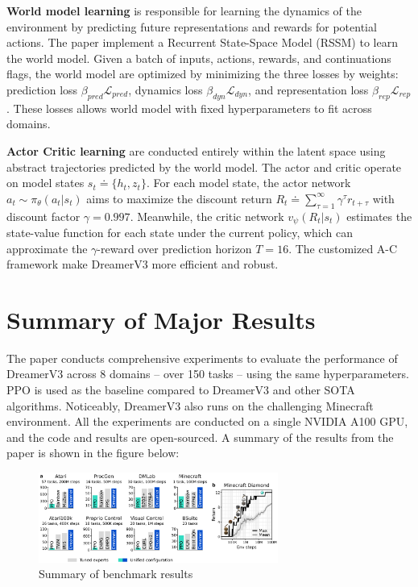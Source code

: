 \documentclass{article}
\begin{document}
\textbf{World model learning} is responsible for learning the dynamics of the environment by predicting future representations and rewards for potential actions. The paper implement a Recurrent State-Space Model (RSSM) to learn the world model. Given a batch of inputs, actions, rewards, and continuations flags, the world model are optimized by minimizing the three losses by weights: prediction loss $\beta_{pred}\mathcal{L}_{pred}$, dynamics loss $\beta_{dyn}\mathcal{L}_{dyn}$, and representation loss $\beta_{rep}\mathcal{L}_{rep}$. These losses allows world model with fixed hyperparameters to fit across domains.

\textbf{Actor Critic learning} are conducted entirely within the latent space using abstract trajectories predicted by the world model. The actor and critic operate on model states $s_t \doteq \{h_t, z_t\}$. For each model state, the actor network $a_t \sim \pi_\theta(a_t | s_t)$ aims to maximize the discount return $R_t \doteq \sum_{\tau = 1}^{\infty} \gamma^{\tau} r_{t+\tau}$ with discount factor $\gamma = 0.997$. Meanwhile, the critic network $v_\psi(R_t | s_t)$ estimates the state-value function for each state under the current policy, which can approximate the $\gamma$-reward over prediction horizon $T=16$. The customized A-C framework make DreamerV3 more efficient and robust.

\section{Summary of Major Results}

The paper conducts comprehensive experiments to evaluate the performance of DreamerV3 across 8 domains -- over 150 tasks -- using the same hyperparameters. PPO \cite{schulman2017proximal} is used as the baseline compared to DreamerV3 and other SOTA algorithms. Noticeably, DreamerV3 also runs on the challenging Minecraft environment. All the experiments are conducted on a single NVIDIA A100 GPU, and the code and results are open-sourced. A summary of the results from the paper is shown in the figure below:

\begin{figure}[h]
    \centering
\includegraphics[width=0.7\textwidth]{./pics/benchmarks.png}
    \caption{Summary of benchmark results \cite{hafner2023mastering}}
    \label{fig:results}
\end{figure}
\end{document}
